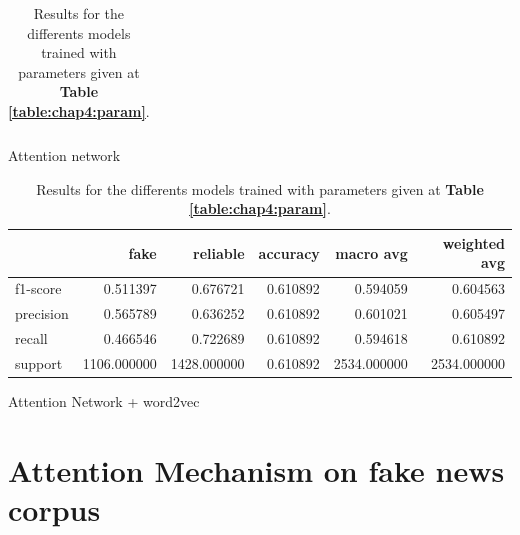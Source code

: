 \begin{table}
\begin{subtable}{\textwidth}
\begin{tabular}{lrrrrr}
\bottomrule
\end{tabular}
\caption{Attention network}
\end{subtable}
\begin{subtable}{\textwidth}
\begin{tabular}{lrrrrr}
\toprule
{} &         fake &     reliable &  accuracy &    macro avg &  weighted avg \\
\midrule
f1-score  &     0.511397 &     0.676721 &  0.610892 &     0.594059 &      0.604563 \\
precision &     0.565789 &     0.636252 &  0.610892 &     0.601021 &      0.605497 \\
recall    &     0.466546 &     0.722689 &  0.610892 &     0.594618 &      0.610892 \\
support   &  1106.000000 &  1428.000000 &  0.610892 &  2534.000000 &   2534.000000 \\
\bottomrule
\end{tabular}
\caption{Attention Network + word2vec}
\end{subtable}
\caption{Results for the differents models trained with parameters given at \textbf{Table \ref{table:chap4:param}}.}
\label{table:chap4:results}
\end{table}
\section{Attention Mechanism on fake news corpus}
